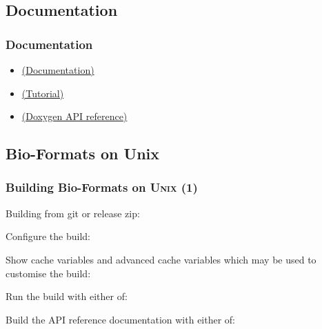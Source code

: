 \documentclass{beamer}
\begin{document}
\subsection{Documentation}

\begin{frame}
  \frametitle{Documentation}
  \begin{itemize}
  \item \href{http://www.openmicroscopy.org/site/support/bio-formats5.1/developers/index.html\#using-bio-formats-as-a-native-c-library}{(Documentation)}
  \item \href{http://www.openmicroscopy.org/site/support/bio-formats5.1/developers/cpp/tutorial.html}{(Tutorial)}
  \item \href{http://downloads.openmicroscopy.org/bio-formats-cpp/5.1.1/api/namespaces.html}{(Doxygen API reference)}
  \end{itemize}
\end{frame}

\subsection{Bio-Formats on Unix}

\begin{frame}[fragile]
  \frametitle{Building Bio-Formats on U\textsc{nix} (1)}
  \scriptsize
  Building from git or release zip:

  Configure the build:

  \begin{semiverbatim}
\end{semiverbatim}

  Show cache variables and advanced cache variables which may be used to customise the build:

  \begin{semiverbatim}
\end{semiverbatim}

Run the build with either of:

  \begin{semiverbatim}
\end{semiverbatim}

Build the API reference documentation with either of:

  \begin{semiverbatim}
\end{semiverbatim}
\end{frame}
\end{document}
